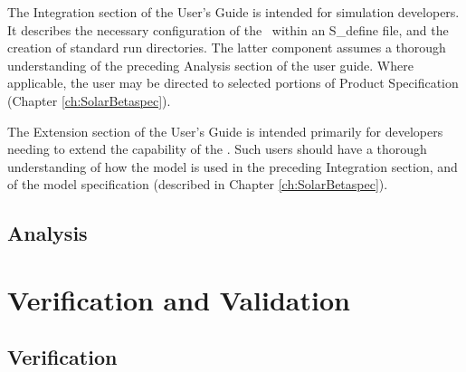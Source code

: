 The Integration section of the User's Guide is intended for simulation
developers.
It describes the necessary configuration of the \SolarBetaDesc\
within an
S\_define file, and the creation of standard run directories.  The
latter
component assumes a thorough understanding of the preceding Analysis
section of the user guide.
Where applicable, the user may be directed to selected portions of
Product Specification (Chapter \ref{ch:SolarBetaspec}).

The Extension section of the User's Guide is intended primarily for
developers
needing to extend the capability of the \SolarBetaDesc.  Such users
should have a
thorough understanding of how the model is used in the preceding
Integration section, and of the model
specification (described in Chapter \ref{ch:SolarBetaspec}).


\section{Analysis}






\chapter{Verification and
Validation}\label{ch:SolarBetaivv}

\section{Verification}





